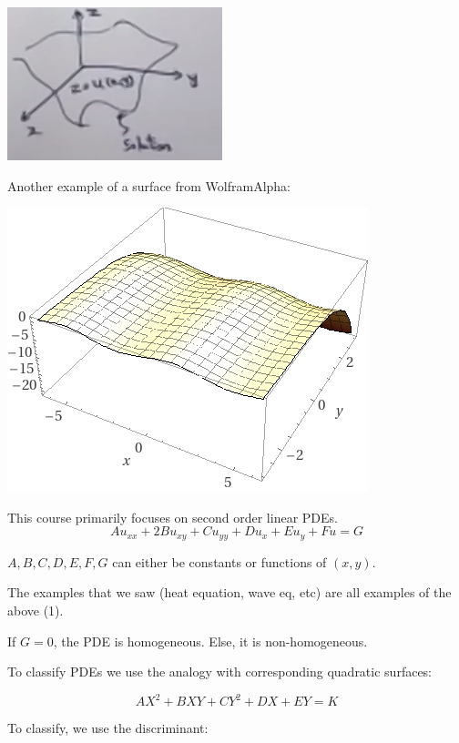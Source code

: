 \includegraphics[width = 0.7 \textwidth]{image1.png}

Another example of a surface from WolframAlpha:

\includegraphics[width = 0.7 \textwidth]{image6.png}

\hfill

This course primarily focuses on second order linear PDEs. 
\begin{equation}
    A u_{xx} + 2 B u_{xy} + C u_{yy} + D u_x + E u_y + Fu = G
\end{equation}

$A,B,C,D,E,F,G$ can either be constants or functions of $(x,y)$.

The examples that we saw (heat equation, wave eq, etc) are all examples of the above (1). 

\hfill


If $G = 0$, the PDE is homogeneous. Else, it is non-homogeneous. 

To classify PDEs we use the analogy with corresponding quadratic surfaces:

$$AX^2 + BXY + CY^2 + DX + EY = K$$

To classify, we use the discriminant:

